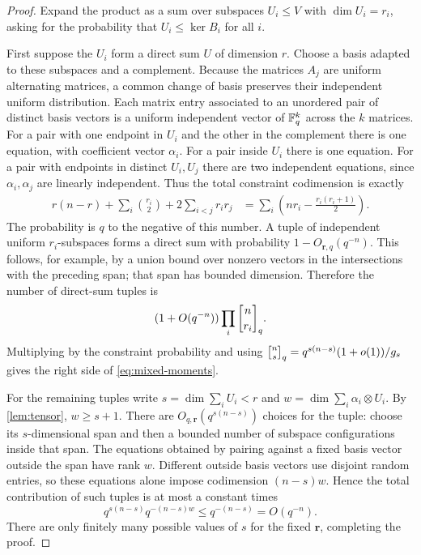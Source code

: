 \begin{proof}
Expand the product as a sum over subspaces $U_i\le V$ with
$\dim U_i=r_i$, asking for the probability that $U_i\le\ker B_i$
for all $i$.

First suppose the $U_i$ form a direct sum $U$ of dimension $r$. Choose a
basis adapted to these subspaces and a complement. Because the matrices
$A_j$ are uniform alternating matrices, a common change of basis preserves
their independent uniform distribution. Each matrix entry associated to an
unordered pair of distinct basis vectors is a uniform independent vector
of $\mathbb F_q^k$ across the $k$ matrices.
For a pair with one endpoint in $U_i$ and the other in the complement there
is one equation, with coefficient vector $\alpha_i$. For a pair inside
$U_i$ there is one equation. For a pair with endpoints in distinct $U_i,U_j$
there are two independent equations, since $\alpha_i,\alpha_j$ are linearly
independent. Thus the total constraint codimension is exactly
\begin{align}
 r(n-r)+\sum_i\binom{r_i}{2}+2\sum_{i<j}r_ir_j
 &=\sum_i\left(nr_i-\frac{r_i(r_i+1)}2\right).
 \label{eq:direct-codim}
\end{align}
The probability is $q$ to the negative of this number. A tuple of
independent uniform $r_i$-subspaces forms a direct sum with probability
$1-O_{\boldsymbol r,q}(q^{-n})$. This follows, for example, by a union bound
over nonzero vectors in the intersections with the preceding span; that
span has bounded dimension. Therefore the number of direct-sum tuples is
\[
 (1+O(q^{-n}))\prod_i\qbinom n{r_i}.
\]
Multiplying by the constraint probability and using
$\qbinom n{s}=q^{s(n-s)}(1+o(1))/g_s$ gives the right side of
\eqref{eq:mixed-moments}.

For the remaining tuples write $s=\dim\sum_iU_i<r$ and
$w=\dim\sum_i\alpha_i\otimes U_i$. By \cref{lem:tensor}, $w\ge s+1$.
There are $O_{q,\boldsymbol r}(q^{s(n-s)})$ choices for the tuple: choose
its $s$-dimensional span and then a bounded number of subspace configurations
inside that span. The equations obtained by pairing against a fixed basis
vector outside the span have rank $w$. Different outside basis vectors use
disjoint random entries, so these equations alone impose codimension
$(n-s)w$. Hence the total contribution of such tuples is at most a constant
times
\[
 q^{s(n-s)}q^{-(n-s)w}
 \le q^{-(n-s)}=O(q^{-n}).
\]
There are only finitely many possible values of $s$ for the fixed
$\boldsymbol r$, completing the proof.
\end{proof}

